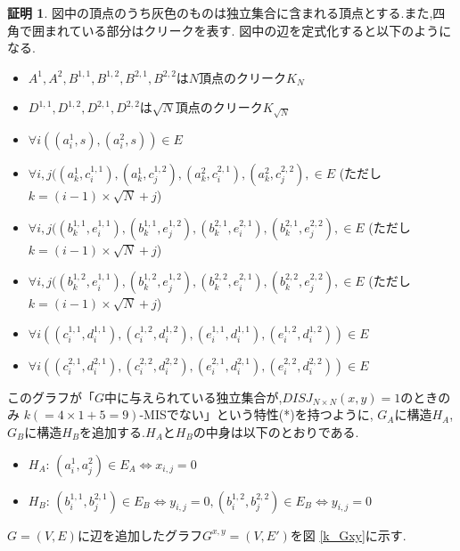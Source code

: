 \documentclass[12pt]{thesis}
\theoremstyle{definition}
\newtheorem*{prf*}{証明}
\begin{document}
\begin{prf*}
図中の頂点のうち灰色のものは独立集合に含まれる頂点とする.また,四角で囲まれている部分はクリークを表す.
図中の辺を定式化すると以下のようになる.
\begin{itemize}
\item $A^{1}, A^{2}, B^{1, 1}, B^{1, 2}, B^{2, 1}, B^{2, 2}$は$N$頂点のクリーク$K_{N}$
\item $D^{1, 1}, D^{1, 2}, D^{2, 1}, D^{2, 2}$は$\sqrt{N}$頂点のクリーク$K_{\sqrt{N}}$
\item $\forall i((a_{i}^{1}, s), (a_{i}^{2}, s)) \in E$
\item $\forall i, j((a_{k}^{1}, c_{i}^{1, 1}), (a_{k}^{1}, c_{j}^{1, 2}), (a_{k}^{2}, c_{i}^{2, 1}), (a_{k}^{2}, c_{j}^{2, 2}), \in E$
(ただし$k = (i - 1) \times \sqrt{N} + j$)
\item $\forall i, j((b_{k}^{1, 1}, e_{i}^{1, 1}), (b_{k}^{1, 1}, e_{j}^{1, 2}), (b_{k}^{2, 1}, e_{i}^{2, 1}), (b_{k}^{2, 1}, e_{j}^{2, 2}), \in E$
(ただし$k = (i - 1) \times \sqrt{N} + j$)
\item $\forall i, j((b_{k}^{1, 2}, e_{i}^{1, 1}), (b_{k}^{1, 2}, e_{j}^{1, 2}), (b_{k}^{2, 2}, e_{i}^{2, 1}), (b_{k}^{2, 2}, e_{j}^{2, 2}), \in E$
(ただし$k = (i - 1) \times \sqrt{N} + j$)
\item $\forall i((c_{i}^{1, 1}, d_{i}^{1, 1}), (c_{i}^{1, 2}, d_{i}^{1, 2}), (e_{i}^{1, 1}, d_{i}^{1, 1}), (e_{i}^{1, 2}, d_{i}^{1, 2})) \in E$
\item $\forall i((c_{i}^{2, 1}, d_{i}^{2, 1}), (c_{i}^{2, 2}, d_{i}^{2, 2}), (e_{i}^{2, 1}, d_{i}^{2, 1}), (e_{i}^{2, 2}, d_{i}^{2, 2})) \in E$
\end{itemize}

このグラフが「$G$中に与えられている独立集合が,$DISJ_{N \times N} (x, y) = 1$のときのみ
$k( = 4 \times 1 + 5 = 9)$-MISでない」という特性(*)を持つように,
$G_{A}$に構造$H_{A}$,$G_{B}$に構造$H_{B}$を追加する.$H_{A}$と$H_{B}$の中身は以下のとおりである.

\begin{itemize}
\item $H_{A}$: $(a_{i}^{1}, a_{j}^{2}) \in E_{A} \Leftrightarrow x_{i, j} = 0$
\item $H_{B}$: $(b_{i}^{1,1}, b_{j}^{2,1}) \in E_{B} \Leftrightarrow y_{i, j} = 0, (b_{i}^{1,2}, b_{j}^{2,2}) \in E_{B} \Leftrightarrow y_{i, j} = 0$
\end{itemize}

$G = (V, E)$に辺を追加したグラフ$G^{x, y} = (V, E')$を図 \ref{k_Gxy}に示す.


\end{prf*}
\end{document}
